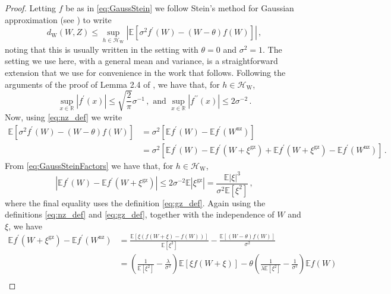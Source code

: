 \documentclass[12pt]{article}
\begin{document}
\begin{proof}
Letting $f$ be as in \eqref{eq:GaussStein} we follow Stein's method for Gaussian approximation (see \cite{chen11}) to write
\begin{equation}\label{eq:GaussPf1}
d_\text{W}(W,Z)\leq\sup_{h\in\mathcal{H}_\text{W}}|\mathbb{E}[\sigma^2f^\prime(W)-(W-\theta)f(W)]|\,,
\end{equation}
noting that this is usually written in the setting with $\theta=0$ and $\sigma^2=1$. The setting we use here, with a general mean and variance, is a straightforward extension that we use for convenience in the work that follows. Following the arguments of the proof of Lemma 2.4 of \cite{chen11}, we have that, for $h\in\mathcal{H}_\text{W}$,
\begin{equation}\label{eq:GaussSteinFactors}
\sup_{x\in\mathbb{R}}|f^\prime(x)|\leq\sqrt{\frac{2}{\pi}}\sigma^{-1}\,,\text{ and }\sup_{x\in\mathbb{R}}|f^{\prime\prime}(x)|\leq2\sigma^{-2}\,.
\end{equation}
Now, using \eqref{eq:nz_def} we write
\begin{align}\label{eq:GaussPf2}
\nonumber\mathbb{E}[\sigma^2f^\prime(W)-(W-\theta)f(W)]
&=\sigma^2\left[\mathbb{E}f^\prime(W)-\mathbb{E}f^\prime(W^\text{nz})\right]\\
&=\sigma^2\left[\mathbb{E}f^\prime(W)-\mathbb{E}f^\prime(W+\xi^\text{gz})+\mathbb{E}f^\prime(W+\xi^\text{gz})-\mathbb{E}f^\prime(W^\text{nz})\right]\,.
\end{align}
From \eqref{eq:GaussSteinFactors} we have that, for $h\in\mathcal{H}_\text{W}$,
\begin{equation}\label{eq:GaussPf3}
\left|\mathbb{E}f^\prime(W)-\mathbb{E}f^\prime(W+\xi^\text{gz})\right|
\leq2\sigma^{-2}\mathbb{E}|\xi^\text{gz}|=\frac{\mathbb{E}|\xi|^3}{\sigma^2\mathbb{E}[\xi^2]}\,,
\end{equation}
where the final equality uses the definition \eqref{eq:gz_def}. Again using the definitions \eqref{eq:nz_def} and \eqref{eq:gz_def}, together with the independence of $W$ and $\xi$, we have
\begin{align}\label{eq:GaussPf4}
\nonumber\mathbb{E}f^\prime(W+\xi^\text{gz})-\mathbb{E}f^\prime(W^\text{nz})
&=\frac{\mathbb{E}[\xi(f(W+\xi)-f(W))]}{\mathbb{E}[\xi^2]}-\frac{\mathbb{E}[(W-\theta)f(W)]}{\sigma^2}\\
\nonumber&=\left(\frac{1}{\mathbb{E}[\xi^2]}-\frac{\lambda}{\sigma^2}\right)\mathbb{E}[\xi f(W+\xi)]-\theta\left(\frac{1}{\lambda\mathbb{E}[\xi^2]}-\frac{1}{\sigma^2}\right)\mathbb{E}f(W)\\

\end{align}
\end{proof}
\end{document}
